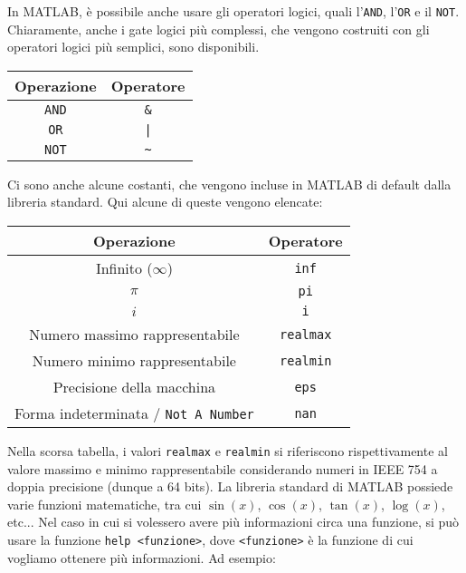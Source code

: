 In MATLAB, è possibile anche usare gli operatori logici, quali l'\texttt{AND}, l'\texttt{OR} e il \texttt{NOT}. Chiaramente, anche i gate logici più complessi, che vengono costruiti con gli operatori logici più semplici, sono disponibili.

\begin{center}
    \begin{tabular}{|c|c|}
        \hline
        \textbf{Operazione} & \textbf{Operatore} \\
        \hline \hline
        \texttt{AND} & \verb|&| \\
        \hline
        \texttt{OR} & \texttt{|} \\
        \hline
        \texttt{NOT} & \verb|~| \\
        \hline
    \end{tabular}
\end{center}

Ci sono anche alcune costanti, che vengono incluse in MATLAB di default dalla libreria standard. Qui alcune di queste vengono elencate:

\begin{center}
    \begin{tabular}{|c|c|}
        \hline
        \textbf{Operazione} & \textbf{Operatore} \\
        \hline\hline
        Infinito ($\infty$) & \texttt{inf} \\
        \hline
        $\pi$ & \texttt{pi} \\
        \hline
        $i$ & \texttt{i} \\
        \hline
        Numero massimo rappresentabile & \texttt{realmax} \\
        \hline
        Numero minimo rappresentabile & \texttt{realmin} \\
        \hline
        Precisione della macchina & \texttt{eps} \\
        \hline
        Forma indeterminata / \texttt{Not A Number} & \texttt{nan} \\
        \hline
    \end{tabular}
\end{center}

Nella scorsa tabella, i valori \texttt{realmax} e \texttt{realmin} si riferiscono rispettivamente al valore massimo e minimo rappresentabile considerando numeri in IEEE 754 a doppia precisione (dunque a 64 bits). La libreria standard di MATLAB possiede varie funzioni matematiche, tra cui $\sin (x)$, $\cos (x)$, $\tan (x)$, $\log (x)$, etc... Nel caso in cui si volessero avere più informazioni circa una funzione, si può usare la funzione \texttt{help <funzione>}, dove \texttt{<funzione>} è la funzione di cui vogliamo ottenere più informazioni. Ad esempio:

